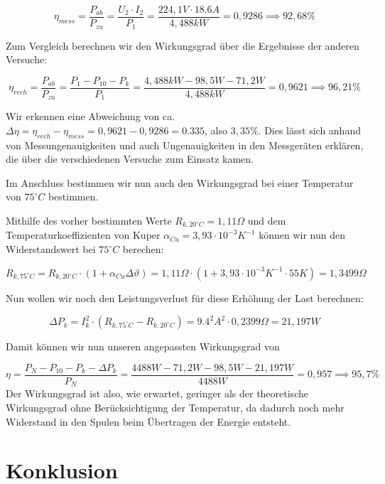 \documentclass{article}
\begin{document}
\begin{equation*}
  \eta_{mess} = \frac{P_{ab}}{P_{zu}} = \frac{U_{2} \cdot I_{2}}{P_{1}} = \frac{224,1V \cdot 18.6A}{4,488kW} = 0,9286 \implies 92,68\%
\end{equation*}

Zum Vergleich berechnen wir den Wirkungsgrad über die Ergebnisse der anderen Versuche:

\begin{equation*}
  \eta_{rech} = \frac{P_{ab}}{P_{zu}} = \frac{P_{1} - P_{10} - P_{k}}{P_{1}} = \frac{4,488kW - 98,5W - 71,2W}{4,488kW} = 0,9621 \implies 96,21\%
\end{equation*}

Wir erkennen eine Abweichung von ca. $\Delta \eta = \eta_{rech} - \eta_{mess} = 0,9621 - 0,9286 = 0.335$, also $3,35\%$. Dies lässt sich anhand von Messungenauigkeiten und auch Ungenauigkeiten in den Messgeräten erklären, die über die verschiedenen Versuche zum Einsatz kamen.

Im Anschluss bestimmen wir nun auch den Wirkungsgrad bei einer Temperatur von $75^{\circ}C$ bestimmen.

Mithilfe des vorher bestimmten Werte $R_{k,20^{\circ}C} = 1,11\Omega$ und dem Temperaturkoeffizienten von Kuper $\alpha_{Cu} = 3,93 \cdot 10^{-3}K^{-1}$ können wir nun den Widerstandswert bei $75^{\circ}C$ berechen:

\begin{equation*}
  \label{eq:4}
  R_{k,75^{\circ}C} = R_{k, 20^{\circ}C} \cdot (1+\alpha_{Cu}\Delta\vartheta) = 1,11\Omega \cdot (1+3,93\cdot 10^{-3}K^{-1}\cdot 55K) = 1,3499\Omega
\end{equation*}

Nun wollen wir noch den Leistungsverlust für diese Erhöhung der Last berechnen:

\begin{equation*}
  \label{eq:2}
  \Delta P_{k} = I_{k}^{2} \cdot (R_{k,75^{\circ}C} - R_{k,20^{\circ}C}) = 9.4^{2}A^{2} \cdot 0,2399\Omega = 21,197W
\end{equation*}

Damit können wir nun unseren angepassten Wirkungsgrad von

\begin{equation*}
  \label{eq:5}
  \eta = \frac{P_{N} - P_{10} - P_{k} - \Delta P_{k}}{P_{N}} = \frac{4488W-71,2W-98,5W-21,197W}{4488W} = 0,957 \implies 95,7\%
\end{equation*}
Der Wirkungsgrad ist also, wie erwartet, geringer als der theoretische Wirkungsgrad ohne Berücksichtigung der Temperatur, da dadurch noch mehr Widerstand in den Spulen beim Übertragen der Energie entsteht.

\section{Konklusion}
\label{sec:konklusion}
\end{document}
